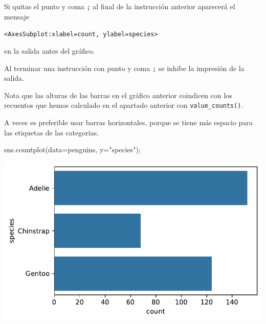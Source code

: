 \documentclass[
  a4paper,
  noprof,
  12pt,
  notoc,
  nosols,
  nobib]{mnye}
\newenvironment{Shaded}{\begin{snugshade}}{\end{snugshade}}
\newcommand{\NormalTok}[1]{\textcolor[rgb]{0.00,0.23,0.31}{#1}}
\newcommand{\OperatorTok}[1]{\textcolor[rgb]{0.37,0.37,0.37}{#1}}
\newcommand{\StringTok}[1]{\textcolor[rgb]{0.13,0.47,0.30}{#1}}
\theoremstyle{definition}
\theoremstyle{remark}
\begin{document}
\begin{tcolorbox}[enhanced jigsaw, bottomrule=.15mm, colframe=quarto-callout-note-color-frame, toprule=.15mm, leftrule=.75mm, breakable, left=2mm, arc=.35mm, rightrule=.15mm, colback=white, opacityback=0]
\begin{minipage}[t]{5.5mm}
\textcolor{quarto-callout-note-color}{\faInfo}
\end{minipage}%
\begin{minipage}[t]{\textwidth - 5.5mm}

Si quitas el punto y coma \texttt{;} al final de la instrucción anterior
aparecerá el mensaje

\texttt{\textless{}AxesSubplot:xlabel=\textquotesingle{}count\textquotesingle{},\ ylabel=\textquotesingle{}species\textquotesingle{}\textgreater{}}

en la salida antes del gráfico.

Al terminar una instrucción con punto y coma \texttt{;} se inhibe la
impresión de la salida.

\end{minipage}%
\end{tcolorbox}

Nota que las alturas de las barras en el gráfico anterior coindicen con
los recuentos que hemos calculado en el apartado anterior con
\texttt{value\_counts()}.

A veces es preferible usar barras horizontales, porque se tiene más
espacio para las etiquetas de las categorías.

\begin{Shaded}
\begin{Highlighting}[]
\NormalTok{sns.countplot(data}\OperatorTok{=}\NormalTok{penguins, y}\OperatorTok{=}\StringTok{"species"}\NormalTok{)}\OperatorTok{;}
\end{Highlighting}
\end{Shaded}

\includegraphics{chapters/1categorical_files/figure-pdf/cell-7-output-1.pdf}
\end{document}
